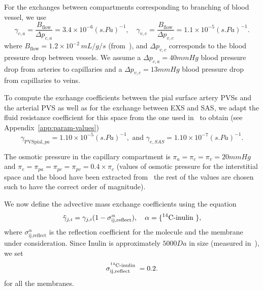 \documentclass[10pt,letterpaper]{article}
\newcommand{\1}{^{(1)}}
\newcommand{\2}{^{(2)}}
\newcommand{\abs}[1]{\left\lvert#1\right\rvert}
\newcommand{\Cinulin}{$\prescript{14}{}{\text{C}}$-inulin }
\begin{document}
For the exchanges between compartments corresponding to branching of blood vessel, we use  
\[
    \gamma_{c , a} =  \frac{B_\text{flow}}{ \Delta p_{c , a}} = 3.4 \times 10^{-6} \si{(s.Pa)^{-1}}, \quad  \gamma_{v , c} =  \frac{B_\text{flow}}{\Delta p_{v , c}} = 1.1 \times 10^{-5}\si{(s.Pa)^{-1}}.
\]
where $B_\text{flow} = 1.2 \times 10^{-2} \, \si{mL/g/s} $ (from~\cite{Muir-2008-CBF}), and $\Delta p_{v , c}$ corresponds to the blood pressure drop between vessels. We assume a $\Delta p_{c , a} = 40 \si{mmHg}$ blood pressure drop from arteries to capillaries and a  $\Delta p_{v , c} = 13 \si{mmHg}$ blood pressure drop from capillaries to veins. 

To compute the exchange coefficients between the pial surface artery PVSs and the arterial PVS as well as for the exchange between EXS and SAS, we adapt the fluid resistance coefficient for this space from the one used in~\cite{Vinje-2020-ICP} to obtain (see Appendix~\ref{app:param-values})
\[
    \gamma_{\text{PVSpial},pa} =  1.10\times 10^{-5} \si{(s.Pa)^{-1}},\text{ and }\gamma_{e,SAS}  =  1.10\times 10^{-7} \si{(s.Pa)^{-1}}.
\]


The osmotic pressure in the capillary compartment is $\pi_a = \pi_c = \pi_v = 20 \si{mmHg}$ and $\pi_e = \pi_{pa} = \pi_{pc} = \pi_{pv} = 0.4\times \pi_c$ (values of osmotic pressure for the interstitial space and the blood have been extracted from~\cite{Levick-1991-Capillary} the rest of the values are chosen such to have the correct order of magnitude).



We now define the advective mass exchange coefficients using the equation
\[
    \tilde \gamma_{j,i} = \gamma_{j,i}(1-\sigma^\alpha_\text{ij,reflect}),\quad \alpha=\{ \text{\Cinulin}\},  
\]
where $\sigma^\alpha_\text{ij,reflect}$ is the reflection coefficient for the molecule and the membrane under consideration.
Since Inulin is approximately $5000 \si{Da}$ in size (measured in~\cite{trainor1982transcapillary}), we set  
\[
    \sigma^\text{\Cinulin}_\text{ij,reflect} = 0.2.
\]
for all the membranes.
\end{document}
